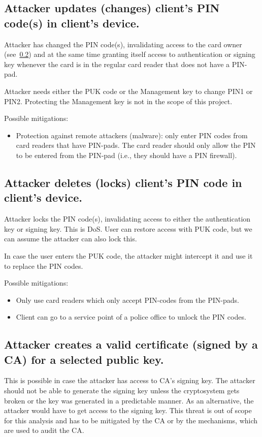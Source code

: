 \subsection{Attacker updates (changes) client's PIN code(s) in client's device.}
Attacker has changed the PIN code(s), invalidating access to the card owner (see~\ref{threat:delete-pin}) and at the same time granting itself access to authentication or signing key whenever the card is in the regular card reader that does not have a PIN-pad.

Attacker needs either the PUK code or the Management key to change PIN1 or PIN2. Protecting the Management key is not in the scope of this project.

Possible mitigations:
\begin{itemize}
	\item Protection against remote attackers (malware): only enter PIN codes from card readers that have PIN-pads. The card reader should only allow the PIN to be entered from the PIN-pad (i.e., they should have a PIN firewall).
\end{itemize}


\subsection{Attacker deletes (locks) client's PIN code in client's device.}\label{threat:delete-pin}
Attacker locks the PIN code(s), invalidating access to either the authentication key or signing key. This is DoS. User can restore access with PUK code, but we can assume the attacker can also lock this.

In case the user enters the PUK code, the attacker might  intercept it and use it to replace the PIN codes.

Possible mitigations:
\begin{itemize}
\item Only use card readers which only accept PIN-codes from the PIN-pads.
\item Client can go to a service point of a police office to unlock the PIN codes.
\end{itemize}




\subsection{Attacker creates a valid certificate (signed by a CA) for a selected public key.}
\label{threat:create-cert}
This is possible in case the attacker has access to CA's signing key. The attacker should not be able to generate the signing key unless the cryptosystem gets broken or the key was generated in a predictable manner. As an alternative, the attacker would have to get access to the signing key. This threat is out of scope for this analysis and has to be mitigated by the CA or by the mechanisms, which are used to audit the CA.

